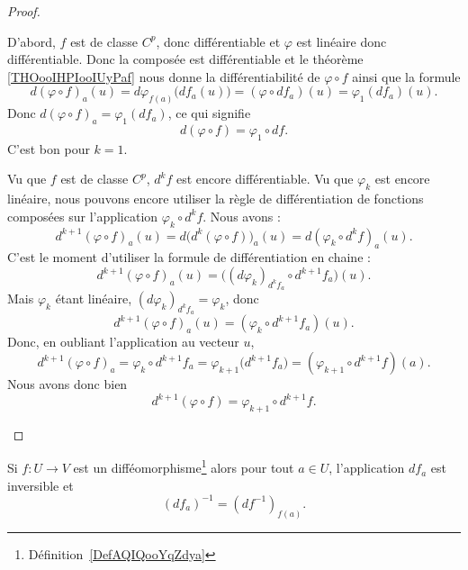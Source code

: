 \begin{proof}
\begin{subproof}
		D'abord, \( f\) est de classe \( C^p\), donc différentiable et \( \varphi\) est linéaire donc différentiable. Donc la composée est différentiable et le théorème \ref{THOooIHPIooIUyPaf} nous donne la différentiabilité de \( \varphi\circ f\) ainsi que la formule
		\begin{equation}
			d(\varphi\circ f)_a(u)=d\varphi_{f(a)}\big( df_a(u) \big)=(\varphi\circ df_a)(u)=\varphi_1(df_a)(u).
		\end{equation}
		Donc \( d(\varphi\circ f)_a=\varphi_1(df_a)\), ce qui signifie
		\begin{equation}
			d(\varphi\circ f)=\varphi_1\circ df.
		\end{equation}
		C'est bon pour \( k=1\).



		Vu que \( f\) est de classe \( C^p\), \( d^kf\) est encore différentiable. Vu que \( \varphi_k\) est encore linéaire, nous pouvons encore utiliser la règle de différentiation de fonctions composées sur l'application \( \varphi_k\circ d^kf\). Nous avons :
		\begin{equation}
			d^{k+1}(\varphi\circ f)_a(u)=d\big( d^k(\varphi\circ f) \big)_a(u)=d(\varphi_k\circ d^kf)_a(u).
		\end{equation}
		C'est le moment d'utiliser la formule de différentiation en chaine :
		\begin{equation}
			d^{k+1}(\varphi\circ f)_a(u)=\big( (d\varphi_k)_{d^kf_a}\circ d^{k+1}f_a \big)(u).
		\end{equation}
		Mais \( \varphi_k\) étant linéaire, \( (d\varphi_k)_{d^kf_a}=\varphi_k\), donc
		\begin{equation}
			d^{k+1}(\varphi\circ f)_a(u)=(\varphi_k\circ d^{k+1}f_a)(u).
		\end{equation}
		Donc, en oubliant l'application au vecteur \( u\),
		\begin{equation}
			d^{k+1}(\varphi\circ f)_a=\varphi_k\circ d^{k+1}f_a=\varphi_{k+1}\big( d^{k+1}f_a \big)=(\varphi_{k+1}\circ d^{k+1}f)(a).
		\end{equation}
		Nous avons donc bien
		\begin{equation}
			d^{k+1}(\varphi\circ f)=\varphi_{k+1}\circ d^{k+1}f.
		\end{equation}
	\end{subproof}
\end{proof}

\begin{lemma}       \label{LemooTJSZooWkuSzv}
	Si \( f\colon U\to V\) est un difféomorphisme\footnote{Définition~\ref{DefAQIQooYqZdya}} alors pour tout \( a\in U\), l'application \( df_a\) est inversible et
	\begin{equation}
		(df_a)^{-1}=(df^{-1})_{f(a)}.
	\end{equation}
\end{lemma}

